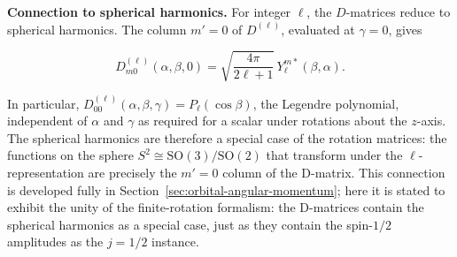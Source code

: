 \medskip\noindent\textbf{Connection to spherical harmonics.} For integer $\ell$, the $D$-matrices reduce to spherical harmonics. The column $m'=0$ of $D^{(\ell)}$, evaluated at $\gamma=0$, gives
\begin{linenomath}
    \begin{equation}
        D^{(\ell)}_{m0}(\alpha,\beta,0)
        = \sqrt{\frac{4\pi}{2\ell+1}}\,Y_\ell^{m*}(\beta,\alpha).
        \label{eq:D-Y-relation}
    \end{equation}
\end{linenomath}
In particular, $D^{(\ell)}_{00}(\alpha,\beta,\gamma) = P_\ell(\cos\beta)$, the Legendre polynomial, independent of $\alpha$ and $\gamma$ as required for a scalar under rotations about the $z$-axis. The spherical harmonics are therefore a special case of the rotation matrices: the functions on the sphere $S^2 \cong \mathrm{SO}(3)/\mathrm{SO}(2)$ that transform under the $\ell$-representation are precisely the $m'=0$ column of the D-matrix. This connection is developed fully in Section~\ref{sec:orbital-angular-momentum}; here it is stated to exhibit the unity of the finite-rotation formalism: the D-matrices contain the spherical harmonics as a special case, just as they contain the spin-$1/2$ amplitudes as the $j=1/2$ instance.


